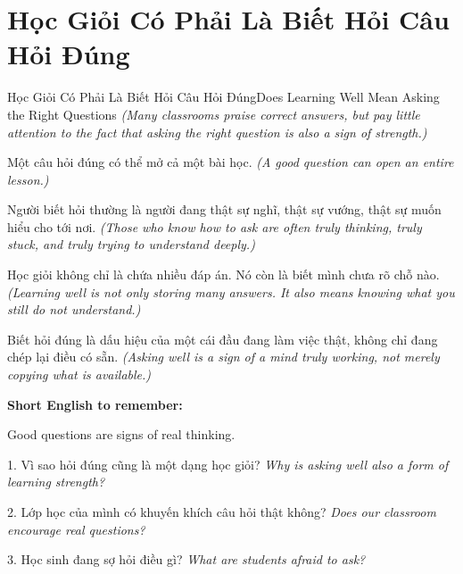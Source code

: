 \section{Học Giỏi Có Phải Là Biết Hỏi Câu Hỏi Đúng}
\begin{truyen}{Học Giỏi Có Phải Là Biết Hỏi Câu Hỏi Đúng}{Does Learning Well Mean Asking the Right Questions}
\textit{(Many classrooms praise correct answers, but pay little attention to the fact that asking the right question is also a sign of strength.)}

Một câu hỏi đúng có thể mở cả một bài học.
\textit{(A good question can open an entire lesson.)}

Người biết hỏi thường là người đang thật sự nghĩ, thật sự vướng, thật sự muốn hiểu cho tới nơi.
\textit{(Those who know how to ask are often truly thinking, truly stuck, and truly trying to understand deeply.)}

Học giỏi không chỉ là chứa nhiều đáp án. Nó còn là biết mình chưa rõ chỗ nào.
\textit{(Learning well is not only storing many answers. It also means knowing what you still do not understand.)}
\end{truyen}

\begin{baihoc}
Biết hỏi đúng là dấu hiệu của một cái đầu đang làm việc thật, không chỉ đang chép lại điều có sẵn.
\textit{(Asking well is a sign of a mind truly working, not merely copying what is available.)}
\end{baihoc}

\begin{ghinhoanh}
\textbf{Short English to remember:}

Good questions are signs of real thinking.

\end{ghinhoanh}

\begin{tuhocnhanh}
1. Vì sao hỏi đúng cũng là một dạng học giỏi? \textit{Why is asking well also a form of learning strength?}

2. Lớp học của mình có khuyến khích câu hỏi thật không? \textit{Does our classroom encourage real questions?}

3. Học sinh đang sợ hỏi điều gì? \textit{What are students afraid to ask?}
\end{tuhocnhanh}
\ngancach

